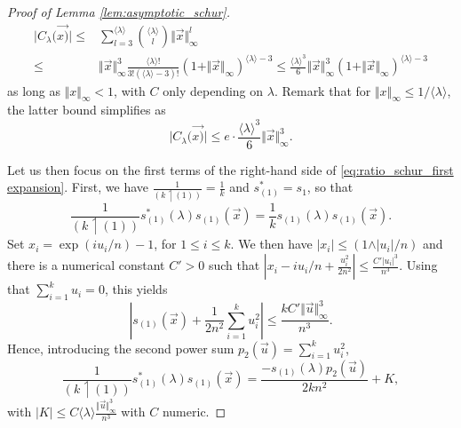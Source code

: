 \documentclass[10pt,11pt]{amsart}%
\begin{document}
\begin{proof}[Proof of Lemma \ref{lem:asymptotic_schur}]
\begin{align}
\vert C_\lambda(\vec{x)}\vert \leq&\sum_{l=3}^{\langle \lambda\rangle}\binom{\langle \lambda\rangle}{l}\Vert \vec{x}\Vert_{\infty}^{l}\nonumber\\
\leq& \Vert \vec{x}\Vert_{\infty}^{3}\frac{\langle \lambda\rangle !}{3!(\langle \lambda\rangle-3)!}(1+\Vert \vec{x}\Vert_{\infty})^{\langle \lambda\rangle-3}\leq \frac{\langle \lambda\rangle^3}{6}\Vert \vec{x}\Vert_{\infty}^{3}(1+\Vert \vec{x}\Vert_{\infty})^{\langle \lambda\rangle-3}\nonumber
\end{align}
as long as $\Vert x\Vert_{\infty}<1$, with $C$ only depending on $\lambda$. Remark that for $\Vert x\Vert_\infty\leq 1/\langle \lambda\rangle$, the latter bound simplifies as
\begin{equation}\label{eq:computation_ratio_first_part}
\vert C_\lambda(\vec{x)}\vert \leq e\cdot \frac{\langle \lambda\rangle^3}{6}\Vert \vec{x}\Vert_{\infty}^{3}.
\end{equation}

Let us then focus on the first terms of the right-hand side of \eqref{eq:ratio_schur_first expansion}. First, we have $\frac{1}{(k\upharpoonleft (1))}=\frac{1}{k}$ and $s_{(1)}^*=s_1$, so that 
$$\frac{1}{(k\upharpoonleft (1))}s_{(1)}^*(\lambda)s_{(1)}(\vec{x})=\frac{1}{k}s_{(1)}(\lambda)s_{(1)}(\vec{x}).$$
Set $x_i=\exp(iu_i/n)-1$, for $1\leq i\leq k$. We then have $\vert x_i\vert\leq (1\wedge \vert u_i\vert/n)$ and there is a numerical constant $C'>0$ such that $\left\vert x_i-iu_i/n+\frac{u_i^2}{2n^2}\right\vert \leq \frac{C'\vert u_i\vert^3}{n^3}$. Using that $\sum_{i=1}^ku_i=0$, this yields
$$\left\vert s_{(1)}(\vec{x})+\frac{1}{2n^2}\sum_{i=1}^ku_i^2\right\vert\leq \frac{kC'\Vert \vec{u}\Vert_{\infty}^3}{n^3}.$$
Hence, introducing the second power sum $p_2(\vec{u})=\sum_{i=1}^ku_i^2$,
\begin{equation}\label{eq:computation_ratio_second_part}\frac{1}{(k\upharpoonleft (1))}s_{(1)}^*(\lambda)s_{(1)}(\vec{x})=\frac{-s_{(1)}(\lambda)p_2(\vec{u})}{2kn^2}+K,
\end{equation}
with $\vert K\vert\leq C\langle \lambda\rangle \frac{\Vert \vec{u}\Vert_{\infty}^3}{n^3}$ with $C$ numeric.


\end{proof}
\end{document}

